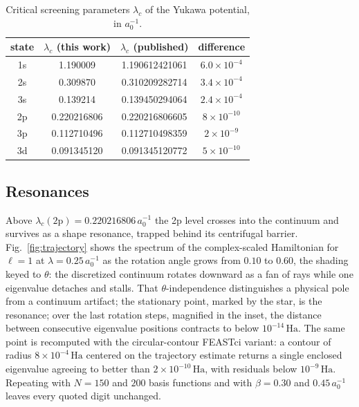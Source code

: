 \documentclass[12pt,twoside]{paper}
\newcommand{\Ha}{\,\mathrm{Ha}}
\begin{document}
\begin{table}[ht]
\caption{Critical screening parameters $\lambda_c$ of the Yukawa
potential, in $a_0^{-1}$.}
\label{tab:lambdac}
\centering
\small
\renewcommand{\arraystretch}{0.95}
\begin{tabular}{cccc}
\hline
state & $\lambda_c$ (this work) & $\lambda_c$ (published) & difference \\
\hline
1s & 1.190009    & 1.190612421061 & $6.0\times10^{-4}$ \\
2s & 0.309870    & 0.310209282714 & $3.4\times10^{-4}$ \\
3s & 0.139214    & 0.139450294064 & $2.4\times10^{-4}$ \\
2p & 0.220216806 & 0.220216806605 & $8\times10^{-10}$ \\
3p & 0.112710496 & 0.112710498359 & $2\times10^{-9}$  \\
3d & 0.091345120 & 0.091345120772 & $5\times10^{-10}$ \\
\end{tabular}
\end{table}

\subsection{Resonances}
\label{sec:resonances}

Above $\lambda_c(2\mathrm{p}) = 0.220216806\,a_0^{-1}$ the 2p level
crosses into the continuum and survives as a shape resonance, trapped
behind its centrifugal barrier. Fig.~\ref{fig:trajectory} shows the
spectrum of the
complex-scaled Hamiltonian for $\ell=1$ at $\lambda = 0.25\,a_0^{-1}$ as the
rotation angle grows from $0.10$ to $0.60$, the shading keyed to $\theta$:
the discretized continuum rotates downward as a fan of rays while one
eigenvalue detaches and stalls. That $\theta$-independence distinguishes a
physical pole from a continuum artifact; the stationary point, marked by
the star, is the resonance; over the last rotation steps, magnified in
the inset, the distance between consecutive eigenvalue positions
contracts to below $10^{-14}\Ha$. The same
point is recomputed with the circular-contour FEASTci variant: a contour
of radius $8\times10^{-4}\Ha$ centered on the trajectory estimate returns a
single enclosed eigenvalue agreeing to better than $2\times10^{-10}\Ha$,
with residuals below $10^{-9}\Ha$. Repeating with $N = 150$ and $200$
basis functions and with $\beta = 0.30$ and $0.45\,a_0^{-1}$ leaves every
quoted digit unchanged.
\end{document}
